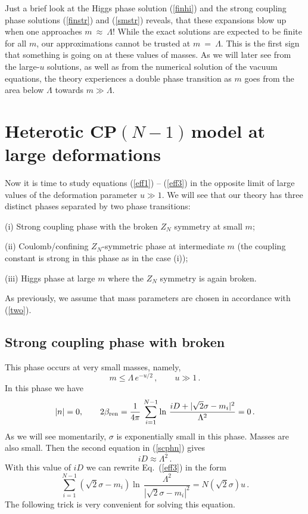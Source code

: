\documentclass[epsfig,12pt]{article}
\def\beq{\begin{equation}}
\def\eeq{\end{equation}}
\newcommand{\cpn}{CP$(N-1)\,$}
\def\beq{\begin{equation}}
\def\eeq{\end{equation}}
\begin{document}
{	Just a brief look at the Higgs phase solution (\ref{finhi}) and the strong coupling phase solutions
	(\ref{finstr}) and (\ref{smstr}) reveals, that these expansions blow up 
	when one approaches $ m ~\approx~ \Lambda $! 
	While the exact solutions are expected to be finite for all $m$, our approximations cannot be trusted
	at $ m ~=~ \Lambda $.
	This is the first sign that something is going on at these values of masses.
	As we will later see from the large-$u$ solutions, as well as from the numerical solution of the 
	vacuum equations, the theory experiences a double phase transition as $m$ goes from the area
	below $ \Lambda $ towards $ m \gg \Lambda $.


\section{ Heterotic \cpn model at large  deformations}
\label{hetdefld}
\setcounter{equation}{0}

Now it is time to study equations (\ref{eff1}) -- (\ref{eff3}) in the opposite limit of large values of 
the deformation parameter $u\gg 1$. We will see that our theory has three distinct phases 
separated by two phase transitions:

\vspace{1mm}

 (i) Strong coupling phase  with the broken $Z_N$
symmetry at small $m$;

(ii)  Coulomb/confining $Z_N$-symmetric
phase at intermediate $m$ (the coupling constant is strong in this phase as in the case (i)); 

(iii) Higgs phase
at large $m$ where the $Z_N$ symmetry is again broken.

\vspace{1mm}

As previously,  we assume that mass parameters are chosen in accordance with
(\ref{two}).

\subsection{ Strong coupling phase with broken }
\label{scpwbz}

This phase occurs at very small masses, namely,
\beq
m\le \Lambda\,e^{-u/2}\,,\qquad u\gg 1\,.
\label{scphmass}
\eeq
In this phase we have 
\beq
|n|=0,\qquad 2\beta_{\rm ren}=\frac{1}{4\pi}\, 
\sum_{i=1}^{N-1}\ln\, {\frac{iD +|\sqrt{2}\sigma-m_i|^2}{\Lambda^2}} =0\, .
\label{scphn}
\eeq
As we will see momentarily,  $\sigma$ is exponentially small in this phase. Masses are also
small. Then the second equation in (\ref{scphn}) gives
\beq
iD\approx \Lambda^2 \,.
\label{scphD}
\eeq
With this value of $iD$ we can rewrite Eq.~(\ref{eff3}) in the form
\beq
 \sum_{i=1}^{N-1}\left(\sqrt{2}\sigma-m_i\right)\ln\, {\frac{\Lambda^2}{\left|\sqrt{2}\sigma-m_i\right|^2}}
=N\left(\sqrt{2}\sigma\right)u\,.
\label{scpheq3}
\eeq
The following trick is very convenient for solving this equation.

}
\end{document}
